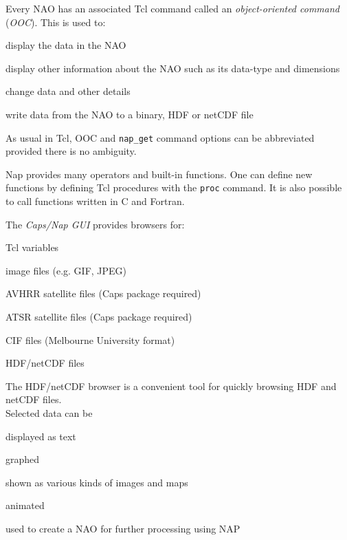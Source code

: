 Every NAO has an associated Tcl command called an 
  \emph{object-oriented command} (\emph{OOC}). This is used to:
\begin{bullets}
    \item display the data in the NAO
    \item display other information about the NAO such as its data-type
    and dimensions
    \item change data and other details
    \item write data from the NAO to a binary, HDF or netCDF file
\end{bullets}

As usual in Tcl, OOC and 
  \texttt{nap\_get} command options can be abbreviated provided
  there is no ambiguity.
  \par Nap provides many operators and built-in functions. One can define
  new functions by defining Tcl procedures with the 
  \texttt{proc} command. It is also possible to call functions
  written in C and Fortran.
  \par The 
  \emph{Caps/Nap GUI} provides browsers for:
\begin{bullets}
    \item Tcl variables
    \item image files (e.g. GIF, JPEG)
    \item AVHRR satellite files (Caps package required)
    \item ATSR satellite files (Caps package required)
    \item CIF files (Melbourne University format)
    \item HDF/netCDF files
\end{bullets}
The HDF/netCDF browser is a convenient tool for quickly browsing
  HDF and netCDF files. 
\\
Selected data can be
\begin{bullets}
    \item displayed as text
    \item graphed
    \item shown as various kinds of images and maps
    \item animated
    \item used to create a NAO for further processing using NAP
\end{bullets}
